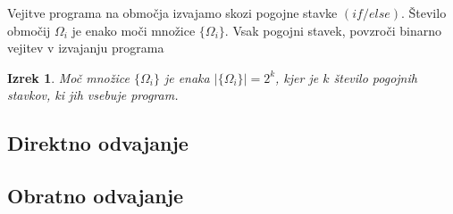 \documentclass{article}
\newtheorem{izrek}{Izrek}[section]
\begin{document}
Vejitve programa na območja izvajamo skozi pogojne stavke $(if/else)$. Število območij $\Omega_i$ je enako moči množice $\{\Omega_i\}$. Vsak pogojni stavek, povzroči binarno vejitev v izvajanju programa

\begin{izrek}
Moč množice $\{\Omega_i\}$ je enaka $\lvert\{\Omega_i \}\rvert=2^k$, kjer je $k$ število pogojnih stavkov, ki jih vsebuje program.
\end{izrek}
\subsection{Direktno odvajanje}
\subsection{Obratno odvajanje}
\end{document}
